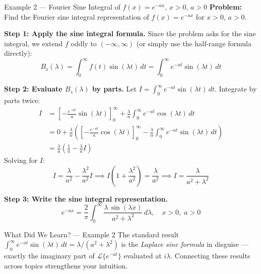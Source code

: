 \documentclass[12pt,a4paper]{article}
\begin{document}
\begin{infobox}{Example 2 --- Fourier Sine Integral of $f(x)=e^{-ax}$, $x>0$, $a>0$}
\textbf{Problem:} Find the Fourier sine integral representation of $f(x)=e^{-ax}$ for $x>0$, $a>0$.

\textbf{Step 1: Apply the sine integral formula.}
Since the problem asks for the sine integral, we extend $f$ oddly to $(-\infty,\infty)$ (or simply use the half-range formula directly):
\[
B_s(\lambda) = \int_0^\infty f(t)\sin(\lambda t)\,dt = \int_0^\infty e^{-at}\sin(\lambda t)\,dt
\]

\textbf{Step 2: Evaluate $B_s(\lambda)$ by parts.}
Let $I = \int_0^\infty e^{-at}\sin(\lambda t)\,dt$. Integrate by parts twice:
\begin{align*}
I &= \left[-\frac{e^{-at}}{a}\sin(\lambda t)\right]_0^\infty + \frac{\lambda}{a}\int_0^\infty e^{-at}\cos(\lambda t)\,dt \\
  &= 0 + \frac{\lambda}{a}\left(\left[-\frac{e^{-at}}{a}\cos(\lambda t)\right]_0^\infty - \frac{\lambda}{a}\int_0^\infty e^{-at}\sin(\lambda t)\,dt\right) \\
  &= \frac{\lambda}{a}\left(\frac{1}{a} - \frac{\lambda}{a}I\right)
\end{align*}
Solving for $I$:
\[
I = \frac{\lambda}{a^2} - \frac{\lambda^2}{a^2}I \implies I\left(1+\frac{\lambda^2}{a^2}\right) = \frac{\lambda}{a^2} \implies I = \frac{\lambda}{a^2+\lambda^2}
\]

\textbf{Step 3: Write the sine integral representation.}
\[
e^{-ax} = \frac{2}{\pi}\int_0^\infty \frac{\lambda\,\sin(\lambda x)}{a^2+\lambda^2}\,d\lambda, \quad x>0,\; a>0
\]
\end{infobox}

\begin{learnbox}{What Did We Learn? --- Example 2}
The standard result $\int_0^\infty e^{-at}\sin(\lambda t)\,dt = \lambda/(a^2+\lambda^2)$ is the \textit{Laplace sine formula} in disguise --- exactly the imaginary part of $\mathcal{L}\{e^{-at}\}$ evaluated at $i\lambda$. Connecting these results across topics strengthens your intuition.
\end{learnbox}
\end{document}
